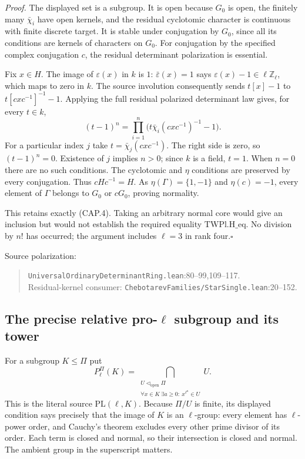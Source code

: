 \emph{Proof.}
The displayed set is a subgroup.  It is open because $G_0$ is open,
the finitely many $\bar\chi_i$ have open kernels, and the residual
cyclotomic character is continuous with finite discrete target.
It is stable under conjugation by $G_0$, since all its conditions are
kernels of characters on $G_0$.  For conjugation by the specified
complex conjugation $c$, the residual determinant polarization is
essential.

Fix $x\in H$.  The image of $\varepsilon(x)$ in $k$ is $1$:
$\bar\varepsilon(x)=1$ says $\varepsilon(x)-1\in\ell\mathbb Z_\ell$,
which maps to zero in $k$.  The source involution consequently sends
$t[x]-1$ to $t[cxc^{-1}]^{-1}-1$.  Applying the full residual polarized
determinant law gives, for every $t\in k$,
\[
 (t-1)^n=
   \prod_{i=1}^{n}\bigl(t\bar\chi_i(cxc^{-1})^{-1}-1\bigr).
 \tag{CAP.5}
\]
For a particular index $j$ take $t=\bar\chi_j(cxc^{-1})$.
The right side is zero, so $(t-1)^n=0$.  Existence of $j$ implies
$n>0$; since $k$ is a field, $t=1$.  When $n=0$ there are no such
conditions.  The cyclotomic and $\eta$ conditions are preserved by
every conjugation.  Thus $cHc^{-1}=H$.  As
$\eta(\Gamma)=\{1,-1\}$ and $\eta(c)=-1$, every element of $\Gamma$
belongs to $G_0$ or $cG_0$, proving normality.

This retains exactly (CAP.4).  Taking an arbitrary normal core would
give an inclusion but would not establish the required equality
$\mathrm{TWPl.H\_eq}$.  No division by $n!$ has occurred; the argument
includes $\ell=3$ in rank four.\hfill$\square$

Source polarization:
\begin{quote}\small
\nolinkurl{UniversalOrdinaryDeterminantRing.lean}:80--99,109--117.\\
Residual-kernel consumer: \nolinkurl{ChebotarevFamilies/StarSingle.lean}:20--152.
\end{quote}

\subsection{The precise relative pro-\texorpdfstring{$\ell$}{ell} subgroup and its tower}

For a subgroup $K\leq\Pi$ put
\[
 P_\ell^\Pi(K)=
 \bigcap_{\substack{U\triangleleft_{\mathrm{open}}\Pi\\
  \forall x\in K\ \exists a\geq0:\ x^{\ell^a}\in U}}U.
 \tag{CAP.6}
\]
This is the literal source $\mathrm{PL}(\ell,K)$.  Because $\Pi/U$
is finite, its displayed condition says precisely that the image of
$K$ is an $\ell$-group: every element has $\ell$-power order, and
Cauchy's theorem excludes every other prime divisor of its order.
Each term is closed and normal, so their intersection is closed and
normal.  The ambient group in the superscript matters.

